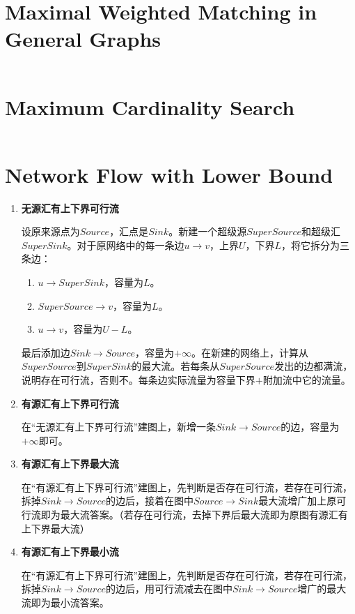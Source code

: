 \documentclass[a4paper,openany]{book}
\newcommand{\cppcode}[1]
{
  \inputminted[mathescape,
  tabsize=4,
  linenos,
  framesep=2mm,
  breakaftergroup=true,
  breakautoindent=true,
  breakbytoken=true,
  breaklines=true,
  fontsize=\small
  ]{cpp}{Source/#1}
}
\begin{document}
\section{Maximal Weighted  Matching in General Graphs}
\cppcode{/Graph Theory/Maximal Weighted  Matching in General Graphs.cpp}
\section{Maximum Cardinality Search}
\cppcode{/Graph Theory/Maximum Cardinality Search.cpp}
\section{Network Flow with Lower Bound}
\begin{enumerate}[1.]
\item \textbf{无源汇有上下界可行流}
  
  设原来源点为$Source$，汇点是$Sink$。新建一个超级源$SuperSource$和超级汇$SuperSink$。对于原网络中的每一条边$u \rightarrow v$，上界$U$，下界$L$，将它拆分为三条边：
  \begin{enumerate}[(1)]
  \item $u \rightarrow SuperSink$，容量为$L$。
  \item $SuperSource \rightarrow v$，容量为$L$。
  \item $u \rightarrow v$，容量为$U-L$。
  \end{enumerate}
  最后添加边$Sink \rightarrow Source$，容量为$+\infty$。在新建的网络上，计算从$SuperSource$到$SuperSink$的最大流。若每条从$SuperSource$发出的边都满流，说明存在可行流，否则不。每条边实际流量为容量下界$+$附加流中它的流量。
\item \textbf{有源汇有上下界可行流}
  
  在``无源汇有上下界可行流''建图上，新增一条$Sink \rightarrow Source$的边，容量为$+\infty$即可。
\item \textbf{有源汇有上下界最大流}
  
  在``有源汇有上下界可行流''建图上，先判断是否存在可行流，若存在可行流，拆掉$Sink \rightarrow Source$的边后，接着在图中$Source \rightarrow Sink$最大流增广加上原可行流即为最大流答案。（若存在可行流，去掉下界后最大流即为原图有源汇有上下界最大流）
\item \textbf{有源汇有上下界最小流}
  
  在``有源汇有上下界可行流''建图上，先判断是否存在可行流，若存在可行流，拆掉$Sink \rightarrow Source$的边后，用可行流减去在图中$Sink \rightarrow Source$增广的最大流即为最小流答案。
\end{enumerate}
\end{document}
